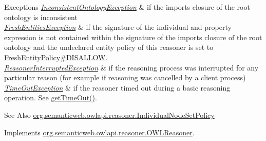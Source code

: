 \begin{DoxyExceptions}{Exceptions}
{\em \hyperlink{classorg_1_1semanticweb_1_1owlapi_1_1reasoner_1_1_inconsistent_ontology_exception}{Inconsistent\-Ontology\-Exception}} & if the imports closure of the root ontology is inconsistent \\
\hline
{\em \hyperlink{classorg_1_1semanticweb_1_1owlapi_1_1reasoner_1_1_fresh_entities_exception}{Fresh\-Entities\-Exception}} & if the signature of the individual and property expression is not contained within the signature of the imports closure of the root ontology and the undeclared entity policy of this reasoner is set to \hyperlink{enumorg_1_1semanticweb_1_1owlapi_1_1reasoner_1_1_fresh_entity_policy_a762eae6d5b2449d125311ecaabfdc8d0}{Fresh\-Entity\-Policy\#\-D\-I\-S\-A\-L\-L\-O\-W}. \\
\hline
{\em \hyperlink{classorg_1_1semanticweb_1_1owlapi_1_1reasoner_1_1_reasoner_interrupted_exception}{Reasoner\-Interrupted\-Exception}} & if the reasoning process was interrupted for any particular reason (for example if reasoning was cancelled by a client process) \\
\hline
{\em \hyperlink{classorg_1_1semanticweb_1_1owlapi_1_1reasoner_1_1_time_out_exception}{Time\-Out\-Exception}} & if the reasoner timed out during a basic reasoning operation. See \hyperlink{classorg_1_1semanticweb_1_1owlapi_1_1reasoner_1_1impl_1_1_o_w_l_reasoner_base_af55342eaaabb1b72dacfde7a181b93d2}{get\-Time\-Out()}. \\
\hline
\end{DoxyExceptions}
\begin{DoxySeeAlso}{See Also}
\hyperlink{enumorg_1_1semanticweb_1_1owlapi_1_1reasoner_1_1_individual_node_set_policy}{org.\-semanticweb.\-owlapi.\-reasoner.\-Individual\-Node\-Set\-Policy} 
\end{DoxySeeAlso}


Implements \hyperlink{interfaceorg_1_1semanticweb_1_1owlapi_1_1reasoner_1_1_o_w_l_reasoner_a6d30f36914ef3931c4629d2a6f6e3b27}{org.\-semanticweb.\-owlapi.\-reasoner.\-O\-W\-L\-Reasoner}.

